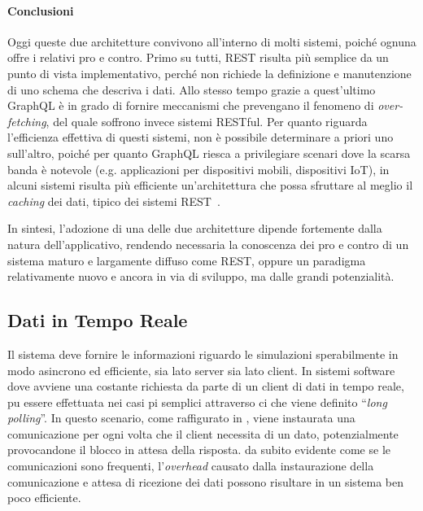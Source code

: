 \paragraph{Conclusioni}\label{par:rest-vs-gql}
Oggi queste due architetture convivono all'interno di molti sistemi, poiché ognuna offre i relativi pro e contro. Primo su tutti, \ac{REST} risulta più semplice
da un punto di vista implementativo, perché non richiede la definizione e manutenzione di uno schema che descriva i dati. Allo stesso tempo grazie a
quest'ultimo GraphQL è in grado di fornire meccanismi che prevengano il fenomeno di \textit{over-fetching}, del quale soffrono invece sistemi RESTful.
Per quanto riguarda l'efficienza effettiva di questi sistemi, non è possibile determinare a priori uno sull'altro, poiché per quanto GraphQL riesca
a privilegiare scenari dove la scarsa banda è notevole (e.g. applicazioni per dispositivi mobili, dispositivi IoT), in alcuni sistemi risulta
più efficiente un'architettura che possa sfruttare al meglio il \textit{caching} dei dati, tipico dei sistemi \ac{REST}~\cite{gql_vs_rest}.

In sintesi, l'adozione di una delle due architetture dipende fortemente dalla natura dell'applicativo, rendendo necessaria la conoscenza
dei pro e contro di un sistema maturo e largamente diffuso come REST, oppure un paradigma relativamente nuovo e ancora in via di sviluppo,
ma dalle grandi potenzialità.

\subsection{Dati in Tempo Reale}\label{ssec:real-time}
Il sistema deve fornire le informazioni riguardo le simulazioni sperabilmente in modo asincrono ed efficiente, sia lato server sia lato client.
In sistemi software dove avviene una costante richiesta da parte di un client di dati in tempo reale, pu essere effettuata nei casi pi semplici
attraverso ci che viene definito ``\textit{long polling}''. In questo scenario, come raffigurato in , viene instaurata
una comunicazione per ogni volta che il client necessita di un dato, potenzialmente provocandone il blocco in attesa della risposta.  da subito
evidente come se le comunicazioni sono frequenti, l'\textit{overhead} causato dalla instaurazione della comunicazione e attesa di ricezione dei dati
possono risultare in un sistema ben poco efficiente.


